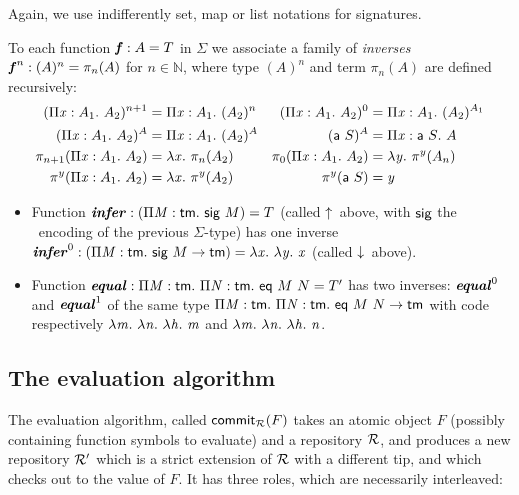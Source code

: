 \documentclass{llncs}
\begin{document}
Again, we use indifferently set, map or list notations for signatures.

\begin{definition}
  To each function $\fct f : A = T$ in $\Sigma$ we associate a family
  of \emph{inverses} $\fcti f n : (A)^n = \pi_n(A)$ for $n\in\mathbb
  N$, where type $(A)^n$ and term $\pi_n(A)$ are defined recursively:
  \begin{align*}
    (\prd x {A_1} {A_2})^{n+1} &= \prd x {A_1} (A_2)^n &
    (\prd x {A_1} {A_2})^0 &= \prd x {A_1} (A_2)^{A_1} \\
    (\prd x {A_1} {A_2})^A &= \prd x {A_1} (A_2)^A &
    (\app {\cst a} S)^A &= \prd x {\app{\cst a} S} A \\
    \pi_{n+1}(\prd x {A_1}{A_2}) &= \lam x \pi_n(A_2) &
    \pi_0(\prd x {A_1} {A_2}) &= \lam {y} \pi^y(A_n) \\
    \pi^y(\prd x {A_1}{A_2}) &= \lam x \pi^y (A_2) &
    \pi^y(\app{\cst a} S) &= \var y
  \end{align*}
\end{definition}

\begin{example}
  \begin{itemize}
  \item
    Function $\fct{infer} : (\prd M {\cst{tm}} \app{\cst{sig}} M)
    = T$ (called $\finfer{}$ above, with $\cst{sig}$ the \LF\ encoding
    of the previous $\Sigma$-type) has one inverse $\fcti{infer}{0} :
    (\prd M {\cst{tm}} {\app{\cst{sig}} M} \to \cst{tm}) = \lam x \lam
    y \var x$ (called $\fget{}$ above).
  \item
    Function $\fct{equal} : \prd M {\cst{tm}} \prd N {\cst{tm}}
    \app{\cst{eq}}\app M N = T'$ has two inverses: $\fcti{equal}{0}$
    and $\fcti{equal}{1}$ of the same type $\prd M {\cst{tm}} \prd N
    {\cst{tm}} \app{\cst{eq}}\app M N \to \cst{tm}$ with code
    respectively $\lam m \lam n \lam h \var m$ and $\lam m \lam n \lam
    h \var n$.
  \end{itemize}
\end{example}

\subsection{The evaluation algorithm}
\label{sec:eval}

The evaluation algorithm, called $\function{commit$_\mr$}{F}$ takes an
atomic object $F$ (possibly containing function symbols to evaluate)
and a repository $\mr$, and produces a new repository $\mr'$ which is
a strict extension of $\mr$ with a different tip, and which checks out
to the value of $F$. It has three roles, which are necessarily
interleaved:
\end{document}
